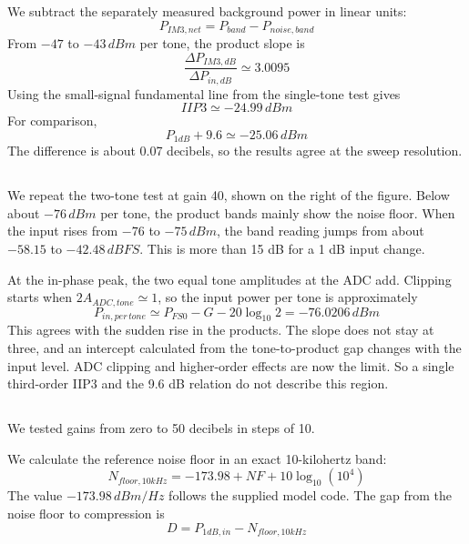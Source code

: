 \documentclass[]{article}
\begin{document}
    We subtract the separately measured background power in linear units:
    \begin{equation*}
        P_{IM3,net}=P_{band}-P_{noise,band}
    \end{equation*}
    From $-47$ to $-43\,dBm$ per tone, the product slope is
    \begin{equation*}
        \boxed{\frac{\Delta P_{IM3,dB}}{\Delta P_{in,dB}}\simeq3.0095}
    \end{equation*}
    Using the small-signal fundamental line from the single-tone test gives
    \begin{equation*}
        \boxed{IIP3\simeq-24.99\,dBm}
    \end{equation*}
    For comparison,
    \begin{equation*}
        P_{1dB}+9.6\simeq-25.06\,dBm
    \end{equation*}
    The difference is about 0.07 decibels, so the results agree at the sweep resolution.


    \subsection{}
    We repeat the two-tone test at gain 40, shown on the right of the figure. Below about $-76\,dBm$ per tone, the product bands mainly show the noise floor. When the input rises from $-76$ to $-75\,dBm$, the band reading jumps from about $-58.15$ to $-42.48\,dBFS$. This is more than 15 dB for a 1 dB input change.

    At the in-phase peak, the two equal tone amplitudes at the ADC add. Clipping starts when $2A_{ADC,tone}\simeq1$, so the input power per tone is approximately
    \begin{equation*}
        P_{in,per\,tone}\simeq P_{FS0}-G-20\log_{10}2=-76.0206\,dBm
    \end{equation*}
    This agrees with the sudden rise in the products. The slope does not stay at three, and an intercept calculated from the tone-to-product gap changes with the input level. ADC clipping and higher-order effects are now the limit. So a single third-order IIP3 and the 9.6 dB relation do not describe this region.

    \subsection{}
    We tested gains from zero to 50 decibels in steps of 10.

    We calculate the reference noise floor in an exact 10-kilohertz band:
    \begin{equation*}
        N_{floor,10kHz}=-173.98+NF+10\log_{10}(10^4)
    \end{equation*}
    The value $-173.98\,dBm/Hz$ follows the supplied model code. The gap from the noise floor to compression is
    \begin{equation*}
        D=P_{1dB,in}-N_{floor,10kHz}
    \end{equation*}
\end{document}
